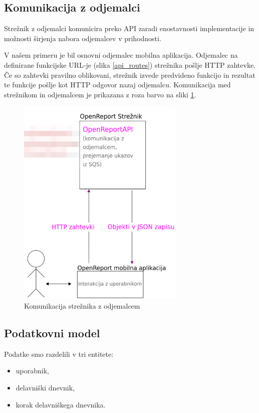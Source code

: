 \documentclass[a4paper, 12pt]{book}
\begin{document}
\subsection{Komunikacija z odjemalci}

Strežnik z odjemalci komunicira preko API zaradi enostavnosti implementacije in možnosti širjenja nabora odjemalcev v prihodnosti.

V našem primeru je bil osnovni odjemalec mobilna aplikacija.
Odjemalec na definirane funkcijske URL-je (slika \ref{api_routes}) strežnika pošlje HTTP zahtevke.
Če so zahtevki pravilno oblikovani, strežnik izvede predvideno funkcijo in rezultat te funkcije pošlje kot HTTP odgovor nazaj odjemalcu.
Komunikacija med strežnikom in odjemalcem je prikazana z roza barvo na sliki \ref{plan_server_client}.

\clearpage

\begin{figure}[H]
\begin{center}
\includegraphics[width=8cm]{plan_server_client}
\end{center}
\caption{Komunikacija strežnika z odjemalcem}
\label{plan_server_client}
\end{figure}


\subsection{Podatkovni model}

Podatke smo razdelili v tri entitete:
\begin{itemize}
	\item uporabnik,
	\item delavniški dnevnik,
	\item korak delavniškega dnevnika.
\end{itemize}
\end{document}
